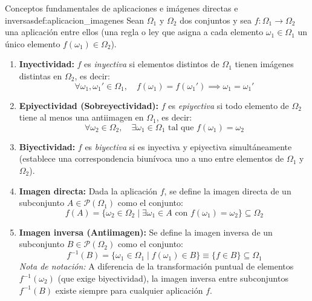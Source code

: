 \begin{definicion}{Conceptos fundamentales de aplicaciones e imágenes directas e inversas}{def:aplicacion_imagenes}
Sean $\Omega_1$ y $\Omega_2$ dos conjuntos y sea $f: \Omega_1 \to \Omega_2$ una aplicación entre ellos (una regla o ley que asigna a cada elemento $\omega_1 \in \Omega_1$ un único elemento $f(\omega_1) \in \Omega_2$).
\begin{enumerate}[label=\arabic*.]
    \item \textbf{Inyectividad:} $f$ es \textit{inyectiva} si elementos distintos de $\Omega_1$ tienen imágenes distintas en $\Omega_2$, es decir:
    \[
        \forall \omega_1, \omega_1' \in \Omega_1, \quad f(\omega_1) = f(\omega_1') \implies \omega_1 = \omega_1'
    \]
    \item \textbf{Epiyectividad (Sobreyectividad):} $f$ es \textit{epiyectiva} si todo elemento de $\Omega_2$ tiene al menos una antiimagen en $\Omega_1$, es decir:
    \[
        \forall \omega_2 \in \Omega_2, \quad \exists \omega_1 \in \Omega_1 \text{ tal que } f(\omega_1) = \omega_2
    \]
    \item \textbf{Biyectividad:} $f$ es \textit{biyectiva} si es inyectiva y epiyectiva simultáneamente (establece una correspondencia biunívoca uno a uno entre elementos de $\Omega_1$ y $\Omega_2$).
    \item \textbf{Imagen directa:} Dada la aplicación $f$, se define la imagen directa de un subconjunto $A \in \mathcal{P}(\Omega_1)$ como el conjunto:
    \[
        f(A) = \{ \omega_2 \in \Omega_2 \mid \exists \omega_1 \in A \text{ con } f(\omega_1) = \omega_2 \} \subseteq \Omega_2
    \]
    \item \textbf{Imagen inversa (Antiimagen):} Se define la imagen inversa de un subconjunto $B \in \mathcal{P}(\Omega_2)$ como el conjunto:
    \[
        f^{-1}(B) = \{ \omega_1 \in \Omega_1 \mid f(\omega_1) \in B \} \equiv \{ f \in B \} \subseteq \Omega_1
    \]
    \textit{Nota de notación:} A diferencia de la transformación puntual de elementos $f^{-1}(\omega_2)$ (que exige biyectividad), la imagen inversa entre subconjuntos $f^{-1}(B)$ existe siempre para cualquier aplicación $f$.
\end{enumerate}
\end{definicion}

\begin{center}
    \vspace{0.2cm}
    \vspace{0.2cm}
\end{center}

